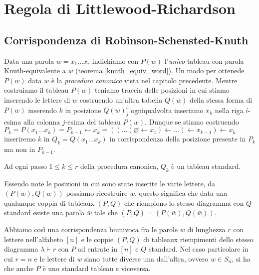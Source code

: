\chapter{Regola di Littlewood-Richardson}
\section{Corrispondenza di Robinson-Schensted-Knuth}\label{RSKcorr}
Data una parola $w=x_1\ldots x_r$ indichiamo con $P(w)$ l'\emph{unico} tableau con
parola Knuth-equivalente a $w$ (teorema \ref{knuth_equiv_word}). Un
modo per ottenede $P(w)$ data $w$ \`e la \emph{procedura canonica}
vista nel capitolo precedente. Mentre costruiamo il tableau $P(w)$
teniamo traccia delle posizioni in cui stiamo inserendo le lettere di
$w$ costruendo un'altra tabella $Q(w)$ della stessa forma di $P(w)$
inserendo $k$ in posizione $Q(w)^i_j$ ogniqualvolta inseriamo $x_k$
nella riga $i$-esima alla colonna $j$-esima del tableau $P(w)$. Dunque
se stiamo costruendo $P_k=P(x_1\ldots x_k)=P_{k-1} \gets x_k =
((\ldots (\varnothing \gets x_1) \gets \ldots ) \gets x_{k-1} ) \gets
x_k$ inseriremo $k$ in $Q_k=Q(x_1 \ldots x_k)$ in corrispondenza della posizione
presente in $P_k$ ma non in $P_{k-1}$.

\begin{oss}
Ad ogni passo $1 \leq k \leq r$ della procedura canonica, $Q_k$ \`e un
tableau standard.
\end{oss}

Essendo note le posizioni in cui sono state inserite le varie lettere,
da $(P(w),Q(w))$ possiamo ricostruire $w$, questo significa che data
una qualunque coppia di tableaux $(P,Q)$ che riempiono lo stesso
diagramma con $Q$ standard esiste una parola $\bar w$ tale che
$(P,Q)=(P(\bar w),Q(\bar w))$.

Abbiamo cos\`i una corrispondenza
biunivoca fra le parole $w$ di lunghezza $r$ con lettere
nell'alfabeto $[n]$ e le coppie $(P,Q)$ di tableaux riempimenti dello
stesso diagramma $\lambda \vdash r$ con $P$ ad entrate in $[n]$ e $Q$
standard. Nel caso particolare in cui $r=n$ e le lettere di $w$ siano
tutte diverse una dall'altra, ovvero $w \in S_n$, si ha che anche $P$
\`e uno standard tableau e viceversa.

